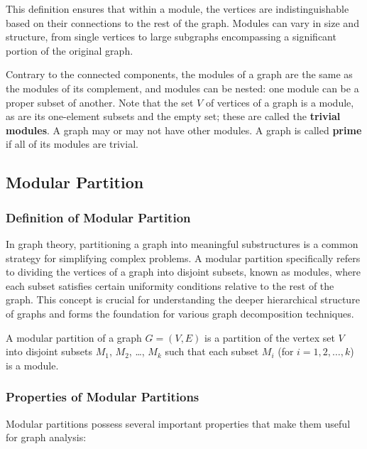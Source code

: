 This definition ensures that within a module, the vertices are indistinguishable based on their connections to the rest of the graph.
Modules can vary in size and structure, from single vertices to large subgraphs encompassing a significant portion of the original graph.

Contrary to the connected components, the modules of a graph are the same as the modules of its complement, and modules can be nested: one module can be a proper subset of another.
Note that the set $V$ of vertices of a graph is a module, as are its one-element subsets and the empty set; these are called the \textbf{trivial modules}.
A graph may or may not have other modules.
A graph is called \textbf{prime} if all of its modules are trivial.

\subsection*{Modular Partition}\label{subsec:modular-partition}

\subsubsection*{Definition of Modular Partition}

In graph theory, partitioning a graph into meaningful substructures is a common strategy for simplifying complex problems.
A modular partition specifically refers to dividing the vertices of a graph into disjoint subsets, known as modules, where each subset satisfies certain uniformity conditions relative to the rest of the graph.
This concept is crucial for understanding the deeper hierarchical structure of graphs and forms the foundation for various graph decomposition techniques.

\begin{mydef}
    A modular partition of a graph $G = (V, E)$ is a partition of the vertex set $V$ into disjoint subsets $M_1$, $M_2$, \ldots, $M_k$ such that each subset $M_i$ (for $i = 1, 2, \ldots, k$) is a module.
\end{mydef}

\subsubsection*{Properties of Modular Partitions}

Modular partitions possess several important properties that make them useful for graph analysis:

